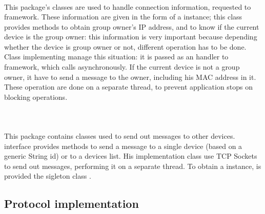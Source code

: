 	\\
	\subsubsection{}
	This package's classes are used to handle connection information, requested to \direct framework. These information are given in the form of a  instance; this class provides methods to obtain group owner's IP address, and to know if the current device is the group owner: this information is very important because depending whether the device is group owner or not, different operation has to be done. Class  implementing  manage this situation: it is passed as an handler to \direct framework, which calls  asynchronously. 
	If the current device is not a group owner, it have to send a  message to the owner, including his MAC address in it.
	These operation are done on a separate thread, to prevent application stops on blocking operations.
	
	\\
	\subsubsection{}
	This package contains classes used to send out messages to other devices.  interface provides methods to send a message to a single device (based on a generic String id) or to a devices list. His implementation class  use TCP Sockets to send out messages, performing it on a separate thread. To obtain a  instance, is provided the sigleton class .
	
\subsection{Protocol implementation}

